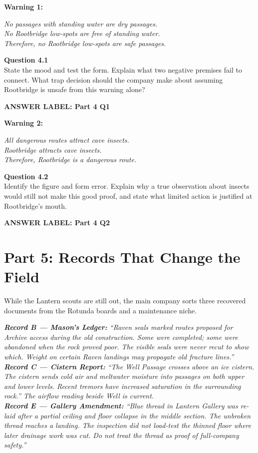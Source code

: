 \documentclass[12pt]{article}
\newcommand{\answerbox}[2]{\par\vspace{0.1em}\noindent\textbf{#1}\par\vspace{0.03em}\noindent\fbox{\begin{minipage}[t][#2]{\dimexpr\textwidth-2\fboxsep-2\fboxrule}\rule{\textwidth}{0pt}\vspace{#2}\end{minipage}}\par\vspace{0.18em}}
\newcommand{\cluebox}[1]{\par\vspace{0.12em}\noindent\begin{minipage}{\textwidth}\itshape #1\end{minipage}\par\vspace{0.12em}}
\begin{document}
\textbf{Warning 1:}
\cluebox{No passages with standing water are dry passages.\\
No Rootbridge low-spots are free of standing water.\\
Therefore, no Rootbridge low-spots are safe passages.}

\textbf{Question 4.1}\\[-0.15em]
State the mood and test the form. Explain what two negative premises fail to connect. What trap decision should the company make about assuming Rootbridge is unsafe from this warning alone?
\answerbox{ANSWER LABEL: Part 4 Q1}{1.75in}

\textbf{Warning 2:}
\cluebox{All dangerous routes attract cave insects.\\
Rootbridge attracts cave insects.\\
Therefore, Rootbridge is a dangerous route.}

\textbf{Question 4.2}\\[-0.15em]
Identify the figure and form error. Explain why a true observation about insects would still not make this good proof, and state what limited action is justified at Rootbridge's mouth.
\answerbox{ANSWER LABEL: Part 4 Q2}{1.65in}

\newpage
\section*{Part 5: Records That Change the Field}
While the Lantern scouts are still out, the main company sorts three recovered documents from the Rotunda boards and a maintenance niche.

\cluebox{\textbf{Record B --- Mason's Ledger:} ``Raven seals marked routes proposed for Archive access during the old construction. Some were completed; some were abandoned when the rock proved poor. The visible seals were never recut to show which. Weight on certain Raven landings may propagate old fracture lines.''\\[0.25em]
\textbf{Record C --- Cistern Report:} ``The Well Passage crosses above an ice cistern. The cistern sends cold air and meltwater moisture into passages on both upper and lower levels. Recent tremors have increased saturation in the surrounding rock.'' The airflow reading beside Well is current.\\[0.25em]
\textbf{Record E --- Gallery Amendment:} ``Blue thread in Lantern Gallery was re-laid after a partial ceiling and floor collapse in the middle section. The unbroken thread reaches a landing. The inspection did not load-test the thinned floor where later drainage work was cut. Do not treat the thread as proof of full-company safety.''}
\end{document}
